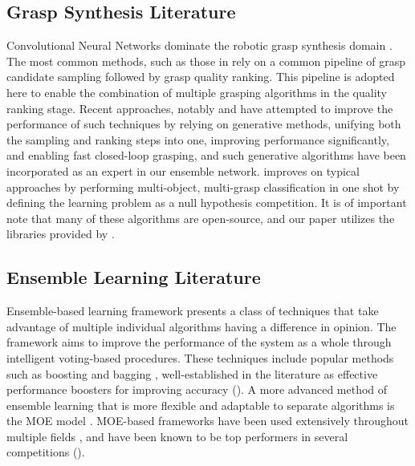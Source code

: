 \documentclass[letterpaper, 10 pt, conference]{ieeeconf}
\begin{document}
\subsection{Grasp Synthesis Literature}
Convolutional Neural Networks dominate the robotic grasp synthesis domain \cite{dataDrivenSurvey}. The most common methods, such as those in \cite{planarGrasp1, planarGrasp2, dexnet2} rely on a common pipeline of grasp candidate sampling followed by grasp quality ranking. This pipeline is adopted here to enable the combination of multiple grasping algorithms in the quality ranking stage. Recent approaches, notably \cite{generative} and \cite{newGenerative} have attempted to improve the performance of such techniques by relying on generative methods, unifying both the sampling and ranking steps into one, improving performance significantly, and enabling fast closed-loop grasping, and such generative algorithms have been incorporated as an expert in our ensemble network. \cite{multigrasp} improves on typical approaches by performing multi-object, multi-grasp classification in one shot by defining the learning problem as a null hypothesis competition. It is of important note that many of these algorithms are open-source, and our paper utilizes the libraries provided by \cite{gqcnn_latest, generative}.

\subsection{Ensemble Learning Literature}
Ensemble-based learning framework presents a class of techniques that take advantage of multiple individual algorithms having a difference in opinion. The framework aims to improve the performance of the system as a whole through intelligent voting-based procedures.  These techniques include popular methods such as boosting \cite{boosting} and bagging \cite{bagging}, well-established in the literature as effective performance boosters for improving accuracy (\cite{ensembleSurvey}). A more advanced method of ensemble learning that is more flexible and adaptable to separate algorithms is the MOE  model \cite{original_moe}.  MOE-based frameworks have been used extensively throughout multiple fields \cite{MOEHistory}, and have been known to be top performers in several competitions (\cite{ASC}).
\end{document}
